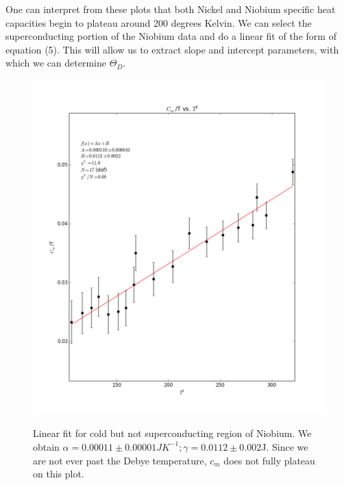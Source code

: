 \documentclass{article}
\begin{document}
One can interpret from these plots that both Nickel and Niobium specific heat capacities begin to plateau around 200 degrees Kelvin. We can select the superconducting portion of the Niobium data and do a linear fit of the form of equation (5). This will allow us to extract slope and intercept parameters, with which we can determine $\Theta_D$.

\begin{figure}[!htb]
	\centering
	\includegraphics[scale=.5]{plots/linfit.png}
 	\label{Nb}
	\caption{Linear fit for cold but not superconducting region of Niobium. We obtain $\alpha = 0.00011 \pm 0.00001JK^{-1}; \gamma = 0.0112 \pm 0.002$J. Since we are not ever past the Debye temperature, $c_m$ does not fully plateau on this plot.}
\end{figure}
\end{document}
